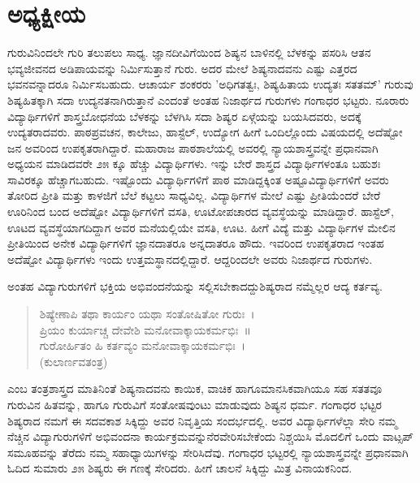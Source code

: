 {\fontsize{14}{16}\selectfont
\chapter{ಅಧ್ಯಕ್ಷೀಯ}

ಗುರುವಿನಿಂದಲೇ ಗುರಿ ತಲುಪಲು ಸಾಧ್ಯ. ಜ್ಞಾನದೀವಿಗೆಯಿಂದ ಶಿಷ್ಯನ ಬಾಳಿನಲ್ಲಿ ಬೆಳಕನ್ನು ಪಸರಿಸಿ ಆತನ ಭವ್ಯಜೀವನದ ಅಡಿಪಾಯವನ್ನು ನಿರ್ಮಿಸುತ್ತಾನೆ ಗುರು. ಅದರ ಮೇಲೆ ಶಿಷ್ಯನಾದವನು ಎಷ್ಟು ಎತ್ತರದ ಭವನವನ್ನಾದರೂ ನಿರ್ಮಿಸಬಹುದು. ಆಚಾರ್ಯ ಶಂಕರರು ’ಅಧಿಗತತ್ವಃ, ಶಿಷ್ಯಹಿತಾಯ ಉದ್ಯತಃ ಸತತಮ್’ \eng{-} ಗುರುವು ಶಿಷ್ಯಹಿತಕ್ಕಾಗಿ ಸದಾ ಉದ್ಯನತನಾಗಿರುತ್ತಾನೆ ಎಂದಂತೆ ಅಂತಹ ನಿಜಾರ್ಥದ ಗುರುಗಳು ಗಂಗಾಧರ ಭಟ್ಟರು. ನೂರಾರು ವಿದ್ಯಾರ್ಥಿಗಳಿಗೆ ಶಾಸ್ತ್ರಬೋಧನೆಯ ಬೆಳಕನ್ನು ಬೆಳಗಿಸಿ ಸದಾ ಶಿಷ್ಯರ ಏಳ್ಗೆಯನ್ನು ಬಯಸಿದವರು, ಅದಕ್ಕೆ ಉದ್ಯತರಾದವರು. ಪಾಠ\eng{-}ಪ್ರವಚನ, ಕಾಲೇಜು, ಹಾಸ್ಟೆಲ್, ಉದ್ಯೋಗ ಹೀಗೆ ಒಂದಿಲ್ಲೊಂದು ವಿಷಯದಲ್ಲಿ ಅದೆಷ್ಟೋ ಜನ ಅವರಿಂದ ಉಪಕೃತರಾಗಿದ್ದಾರೆ. ಮಹಾರಾಜ ಪಾಠಶಾಲೆಯಲ್ಲಿ ಅವರಲ್ಲಿ ನ್ಯಾಯಶಾಸ್ತ್ರವನ್ನೇ ಪ್ರಧಾನವಾಗಿ ಅಧ್ಯಯನ ಮಾಡಿದವರೇ ೨೫ ಕ್ಕೂ ಹೆಚ್ಚು ವಿದ್ಯಾರ್ಥಿಗಳು. ಇನ್ನು ಬೇರೆ ಶಾಸ್ತ್ರದ ವಿದ್ಯಾರ್ಥಿಗಳಂತೂ ಬಹುಶಃ ಸಾವಿರಕ್ಕೂ ಹೆಚ್ಚಾಗಬಹುದು. ಇಷ್ಟೊಂದು ವಿದ್ಯಾರ್ಥಿಗಳಿಗೆ ಪಾಠ ಮಾಡಿದ್ದಕ್ಕಿಂತ ಅಷ್ಟೂ\break ವಿದ್ಯಾರ್ಥಿಗಳಿಗೆ ಅವರು ತೋರಿದ ಪ್ರೀತಿ ಮತ್ತು ಕಾಳಜಿಗೆ ಬೆಲೆ ಕಟ್ಟಲು ಸಾಧ್ಯವಿಲ್ಲ. ವಿದ್ಯಾರ್ಥಿಗಳ ಮೇಲೆ ಎಷ್ಟು ಪ್ರೀತಿಯೆಂದರೆ ಬೇರೆ ಊರಿನಿಂದ ಬಂದ ಅದೆಷ್ಟೋ ವಿದ್ಯಾರ್ಥಿಗಳಿಗೆ ವಸತಿ, ಊಟೋಪಚಾರದ ವ್ಯವಸ್ಥೆಯನ್ನು ಮಾಡಿದ್ದಾರೆ. ಹಾಸ್ಟೆಲ್, ಊಟದ ವ್ಯವಸ್ಥೆಯಾಗದಿದ್ದಾಗ ಅವರ ಮನೆಯಲ್ಲಿಯೇ ವಸತಿ, ಊಟ. ಹೀಗೆ ವಿದ್ಯೆ ಮತ್ತು ವಿದ್ಯಾರ್ಥಿಗಳ ಮೇಲಿನ ಪ್ರೀತಿಯಿಂದ ಅನೇಕ ವಿದ್ಯಾರ್ಥಿಗಳಿಗೆ ಜ್ಞಾನದಾತರೂ ಅನ್ನದಾತರೂ ಹೌದು. ಇವರಿಂದ ಉಪಕೃತರಾದ ಇಂತಹ ಅದೆಷ್ಟೋ ವಿದ್ಯಾರ್ಥಿಗಳು ಇಂದು ಉತ್ತಮಸ್ಥಾನದಲ್ಲಿದ್ದಾರೆ. ಆದ್ದರಿಂದಲೇ ಅವರು ನಿಜಾರ್ಥದ ಗುರುಗಳು.

ಅಂತಹ ವಿದ್ಯಾಗುರುಗಳಿಗೆ ಭಕ್ತಿಯ ಅಭಿವಂದನೆಯನ್ನು ಸಲ್ಲಿಸಬೇಕಾದದ್ದು\break ಶಿಷ್ಯರಾದ ನಮ್ಮೆಲ್ಲರ ಆದ್ಯ ಕರ್ತವ್ಯ.
\begin{verse}
ಶಿಷ್ಯೇಣಾಪಿ ತಥಾ ಕಾರ್ಯಂ ಯಥಾ ಸಂತೋಷಿತೋ ಗುರುಃ~।\\
ಪ್ರಿಯಂ ಕುರ್ಯಾಚ್ಚ ದೇವೇಶಿ ಮನೋವಾಕ್ಕಾಯಕರ್ಮಭಿಃ~॥\\
ಗುರೋರ್ಹಿತಂ ಹಿ ಕರ್ತವ್ಯಂ ಮನೋವಾಕ್ಕಾಯಕರ್ಮಭಿಃ~।\\ 
\hspace{6cm}(ಕುಲಾರ್ಣವತಂತ್ರ)
\end{verse}
ಎಂಬ ತಂತ್ರಶಾಸ್ತ್ರದ ಮಾತಿನಿಂತೆ ಶಿಷ್ಯನಾದವನು ಕಾಯಿಕ, ವಾಚಿಕ ಹಾಗೂ\break ಮಾನಸಿಕವಾಗಿಯೂ ಸಹ ಸತತವೂ ಗುರುವಿನ ಹಿತವನ್ನು, ಹಾಗೂ ಗುರುವಿಗೆ ಸಂತೋಷವುಂಟು ಮಾಡುವುದು ಶಿಷ್ಯನ ಧರ್ಮ. ಗಂಗಾಧರ ಭಟ್ಟರ ಶಿಷ್ಯರಾದ ನಮಗೆ ಈ ಸದವಕಾಶ ಸಿಕ್ಕಿದ್ದು ಅವರ ನಿವೃತ್ತಿಯ ಸಂದರ್ಭದಲ್ಲಿ. ಅವರ ವಿದ್ಯಾರ್ಥಿಗಳೆಲ್ಲಾ ಸೇರಿ ನಮ್ಮ ನೆಚ್ಚಿನ ವಿದ್ಯಾಗುರುಗಳಿಗೆ ಅಭಿವಂದನಾ ಕಾರ್ಯಕ್ರಮವನ್ನು\break ನೆರವೇರಿಸಬೇಕೆಂದು ನಿಶ್ಚಯಿಸಿ ಮೊದಲಿಗೆ ಒಂದು ವಾಟ್ಸಪ್ ಸಮೂಹವನ್ನು ತೆರೆದು ನಮ್ಮ ಸಹಾಧ್ಯಾಯಿಗಳನ್ನು ಸೇರಿಸಿದೆವು. ಗಂಗಾಧರ ಭಟ್ಟರಲ್ಲಿ ನ್ಯಾಯಶಾಸ್ತ್ರವನ್ನೇ ಪ್ರಧಾನವಾಗಿ ಓದಿದ ಸುಮಾರು ೨೫ ಶಿಷ್ಯರು ಈ ಗಣಕ್ಕೆ ಸೇರಿದರು. ಹೀಗೆ ಚಾಲನೆ ಸಿಕ್ಕಿದ್ದು ಮಿತ್ರ ವಿನಾಯಕನಿಂದ.

}
